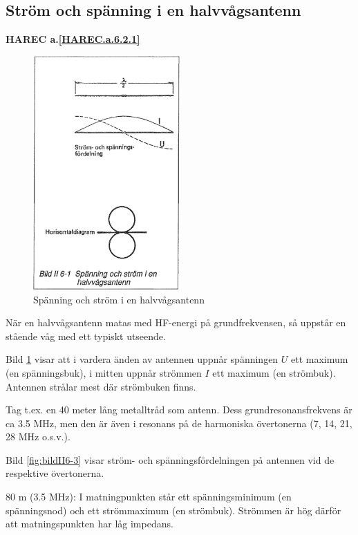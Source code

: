 \subsection{Ström och spänning i en halvvågsantenn}
\textbf{
HAREC a.\ref{HAREC.a.6.2.1}\label{myHAREC.a.6.2.1}
}

\begin{figure}
  \includegraphics[width=0.5\textwidth]{images/bild_2_6-01}
  \caption{Spänning och ström i en halvvågsantenn}
  \label{fig:bildII6-1}
\end{figure}

När en halvvågsantenn matas med HF-energi på grundfrekvensen, så
uppstår en stående våg med ett typiskt utseende.

Bild \ref{fig:bildII6-1} visar att i vardera änden av antennen uppnår spänningen
\(U\) ett maximum (en spänningsbuk), i mitten uppnår strömmen \(I\)
ett maximum (en strömbuk).  Antennen strålar mest där strömbuken
finns.

Tag t.ex. en 40 meter lång metalltråd som antenn. Dess
grundresonansfrekvens är ca 3.5 MHz, men den är även i resonans på de
harmoniska övertonerna (7, 14, 21, 28 MHz o.s.v.).

Bild \ref{fig:bildII6-3} visar ström- och spänningsfördelningen på antennen vid de
respektive övertonerna.

80 m (3.5 MHz): I matningpunkten står ett spänningsminimum (en
spänningsnod) och ett strömmaximum (en strömbuk). Strömmen är hög
därför att matningspunkten har låg impedans.

